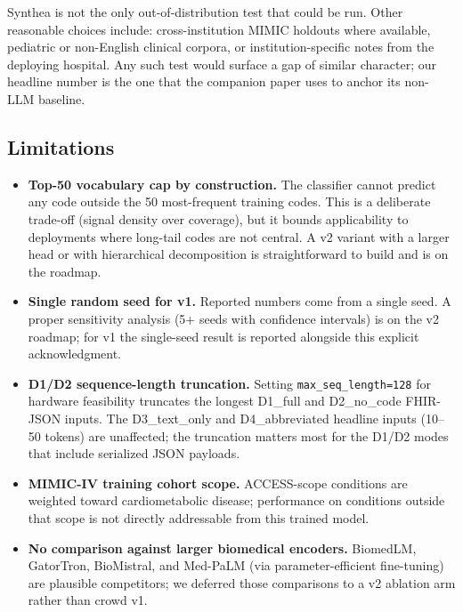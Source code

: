 Synthea is not the only out-of-distribution test that could be
run. Other reasonable choices include: cross-institution MIMIC
holdouts where available, pediatric or non-English clinical
corpora, or institution-specific notes from the deploying
hospital. Any such test would surface a gap of similar character;
our headline number is the one that the companion paper
\autocite{FungPhantomCodes2026} uses to anchor its non-LLM baseline.

\subsection{Limitations}\label{limitations}

\begin{itemize}
\tightlist
\item
  \textbf{Top-50 vocabulary cap by construction.} The classifier
  cannot predict any code outside the 50 most-frequent training
  codes. This is a deliberate trade-off (signal density over
  coverage), but it bounds applicability to deployments where
  long-tail codes are not central. A v2 variant with a larger
  head or with hierarchical decomposition is straightforward to
  build and is on the roadmap.
\item
  \textbf{Single random seed for v1.} Reported numbers come from a
  single seed. A proper sensitivity analysis (5+ seeds with
  confidence intervals) is on the v2 roadmap; for v1 the
  single-seed result is reported alongside this explicit
  acknowledgment.
\item
  \textbf{D1/D2 sequence-length truncation.} Setting
  \texttt{max\_seq\_length=128} for hardware feasibility truncates the
  longest D1\_full and D2\_no\_code FHIR-JSON inputs. The
  D3\_text\_only and D4\_abbreviated headline inputs (10--50
  tokens) are unaffected; the truncation matters most for the
  D1/D2 modes that include serialized JSON payloads.
\item
  \textbf{MIMIC-IV training cohort scope.} ACCESS-scope conditions
  are weighted toward cardiometabolic disease; performance on
  conditions outside that scope is not directly addressable from
  this trained model.
\item
  \textbf{No comparison against larger biomedical encoders.} BiomedLM,
  GatorTron, BioMistral, and Med-PaLM (via parameter-efficient
  fine-tuning) are plausible competitors; we deferred those
  comparisons to a v2 ablation arm rather than crowd v1.
\end{itemize}

